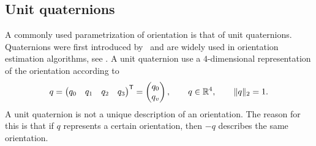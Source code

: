 \subsection{Unit quaternions}
A commonly used parametrization of orientation is that of unit quaternions. Quaternions were first introduced by~\cite{hamilton:1844} and are widely used in orientation estimation algorithms, see \eg \cite{kuipers:1999,hol:2011}. A unit quaternion use a $4$-dimensional representation of the orientation according to
\begin{align}
q = \begin{pmatrix} q_0 & q_1 & q_2 & q_3 \end{pmatrix}^{\mathsf{T}} = \begin{pmatrix} q_0 \\ q_v \end{pmatrix}, \qquad q \in \mathbb{R}^4, \qquad \| q\|_2 = 1.
\end{align}
A unit quaternion is not a unique description of an orientation. The reason for this is that if $q$ represents a certain orientation, then $-q$ describes the same orientation. 

